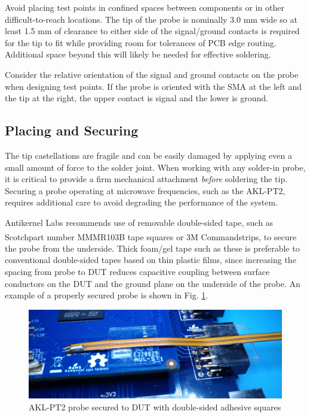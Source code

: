 \documentclass[11pt]{article}
\newcommand{\rtm}{\textsuperscript{\textregistered\space}}
\begin{document}
Avoid placing test points in confined spaces between components or in other difficult-to-reach locations. The tip of
the probe is nominally 3.0 mm wide so at least 1.5 mm of clearance to either side of the signal/ground contacts is
required for the tip to fit while providing room for tolerances of PCB edge routing. Additional space beyond this will
likely be needed for effective soldering.

Consider the relative orientation of the signal and ground contacts on the probe when designing test points. If the
probe is oriented with the SMA at the left and the tip at the right, the upper contact is signal and the lower is
ground.

\subsection{Placing and Securing}

The tip castellations are fragile and can be easily damaged by applying even a small amount of force to the solder
joint. When working with any solder-in probe, it is critical to provide a firm mechanical attachment \emph{before}
soldering the tip. Securing a probe operating at microwave frequencies, such as the AKL-PT2, requires additional care
to avoid degrading the performance of the system.

Antikernel Labs recommends use of removable double-sided tape, such as Scotch\rtm part number MMMR103B tape squares or
3M Command\rtm strips, to secure the probe from the underside. Thick foam/gel tape such as these is preferable to
conventional double-sided tapes based on thin plastic films, since increasing the spacing from probe to DUT reduces
capacitive coupling between surface conductors on the DUT and the ground plane on the underside of the probe. An example
of a properly secured probe is shown in Fig. \ref{secured-tip}.

\begin{figure}[h]
\centering
\includegraphics[width=12cm]{secured-tip.jpg}
\caption{AKL-PT2 probe secured to DUT with double-sided adhesive squares}
\label{secured-tip}
\end{figure}
\end{document}
